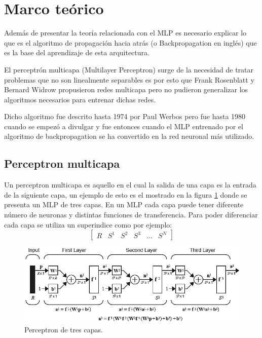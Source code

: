 \section{Marco teórico}
Además de presentar la teoría relacionada con el MLP es necesario explicar lo que es el algoritmo de propagación hacia atrás (o Backpropagation en inglés) que es la base del aprendizaje de esta arquitectura.

El perceptrón multicapa (Multilayer Perceptron) surge de la necesidad de tratar problemas que no son linealmente separables es por esto que Frank Rosenblatt y Bernard Widrow propusieron redes multicapa pero no pudieron generalizar los algoritmos necesarios para entrenar dichas redes.

Dicho algoritmo fue descrito hasta 1974 por Paul Werbos pero fue hasta 1980 cuando se empezó a divulgar y fue entonces cuando el MLP entrenado por el algoritmo de backpropagation se ha convertido en la red neuronal más utilizado. \cite{libro1}
\subsection{Perceptron multicapa}
Un perceptron multicapa es aquello en el cual la salida de una capa es la entrada de la siguiente capa, un ejemplo de esto es el mostrado en la figura \ref{fig:MLP} donde se presenta un MLP de tres capas. En un MLP cada capa puede tener diferente número de neuronas y distintas funciones de transferencia. Para poder diferenciar cada capa se utiliza un superindice como por ejemplo:
\[ \begin{bmatrix} R & S^1 & S^2 & S^3 & \dots & S^N \end{bmatrix} \]

\begin{figure}[H]
    \begin{center}
        \includegraphics[width=16cm]{img/MLP.png}
        \caption{Perceptron de tres capas. \cite{libro1}}
        \label{fig:MLP}
    \end{center}
\end{figure}

